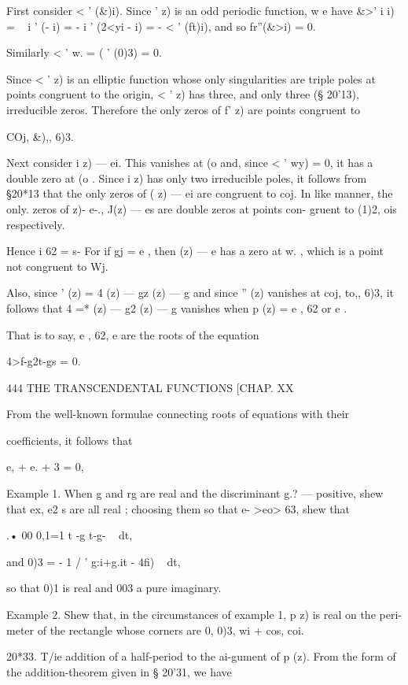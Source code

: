 {First consider < ' (\&)i). Since ' z) is an odd periodic function, w e
have \&>' i i) = ~ i ' (- i) = - i ' (2<yi - i) = - < ' (ft)i), and so
fr''(\&>i) = 0.

Similarly < ' w. = ( ' (0)3) = 0.

Since < ' z) is an elliptic function whose only singularities are
triple poles at points congruent to the origin, < ' z) has three, and
only three (§ 20'13), irreducible zeros. Therefore the only zeros of
f' z) are points congruent to

COj, \&),, 6)3.

Next consider i z) — ei. This vanishes at (o and, since < ' wy) = 0,
it has a double zero at (o . Since i z) has only two irreducible
poles, it follows from §20*13 that the only zeros of ( z) — ei are
congruent to coj. In like manner, the only. zeros of z)- e-., J(z) —
es are double zeros at points con- gruent to (1)2, ois respectively.

Hence i 62 = s- For if gj = e , then (z) — e has a zero at w. , which
is a point not congruent to Wj.

Also, since ' (z) = 4 (z) — gz (z) — g and since '' (z) vanishes at
coj, to,, 6)3, it follows that 4 =* (z) — g2 (z) — g vanishes when p
(z) = e , 62 or e .

That is to say, e , 62, e are the roots of the equation

4>f-g2t-gs = 0.



444 THE TRANSCENDENTAL FUNCTIONS [CHAP. XX

From the well-known formulae connecting roots of equations with their

coefficients, it follows that

e, + e. + 3 = 0,

Example 1. When g and rg are real and the discriminant g.? — %
positive, shew that ex, e2 s are all real ; choosing them so that e-
>eo> 63, shew that

.• 00 0,1=1 t -g t-g- ~ dt,

and 0)3 = - 1 / ' g:i+g.it - 4fi) ~ dt,

so that 0)1 is real and 003 a pure imaginary.

Example 2. Shew that, in the circumstances of example 1, p z) is real
on the peri- meter of the rectangle whose corners are 0, 0)3, wi +
cos, coi.

20*33. T/ie addition of a half-period to the ai-gument of p (z). From
the form of the addition-theorem given in § 20'31, we have



}
